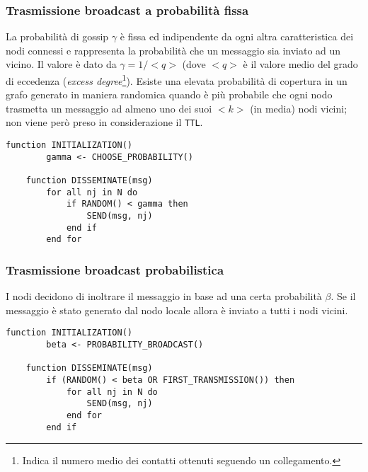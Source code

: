 \begin{appendices}
    \subsubsection{Trasmissione broadcast a probabilità fissa}
    La probabilità di gossip $\gamma$ è fissa ed indipendente da ogni altra caratteristica dei nodi connessi e rappresenta la probabilità che un messaggio sia inviato ad un vicino. Il valore è dato da $\gamma = 1/<q>$ (dove $<q>$ è il valore medio del grado di eccedenza (\textit{excess degree}\footnote{Indica il numero medio dei contatti ottenuti seguendo un collegamento.}).\newline
    Esiste una elevata probabilità di copertura in un grafo generato in maniera randomica quando è più probabile che ogni nodo trasmetta un messaggio ad almeno uno dei suoi $<k>$ (in media) nodi vicini; non viene però preso in considerazione il \texttt{TTL}.
    \begin{lstlisting}[caption=Pseudocodice dell'algoritmo di diffusione con $\gamma$ fisso]
    function INITIALIZATION()
        gamma <- CHOOSE_PROBABILITY()
    
    function DISSEMINATE(msg)
        for all nj in N do
            if RANDOM() < gamma then
                SEND(msg, nj)
            end if
        end for
    \end{lstlisting}
    
    \subsubsection{Trasmissione broadcast probabilistica}
    I nodi decidono di inoltrare il messaggio in base ad una certa probabilità $\beta$. Se il messaggio è stato generato dal nodo locale allora è inviato a tutti i nodi vicini.
    
    \begin{lstlisting}[caption=Pseudocodice dell'algoritmo di diffusione con a broadcast probabilistica]
    function INITIALIZATION()
        beta <- PROBABILITY_BROADCAST()
    
    function DISSEMINATE(msg)
        if (RANDOM() < beta OR FIRST_TRANSMISSION()) then
            for all nj in N do
                SEND(msg, nj)
            end for
        end if
    \end{lstlisting}
    

\end{appendices}
